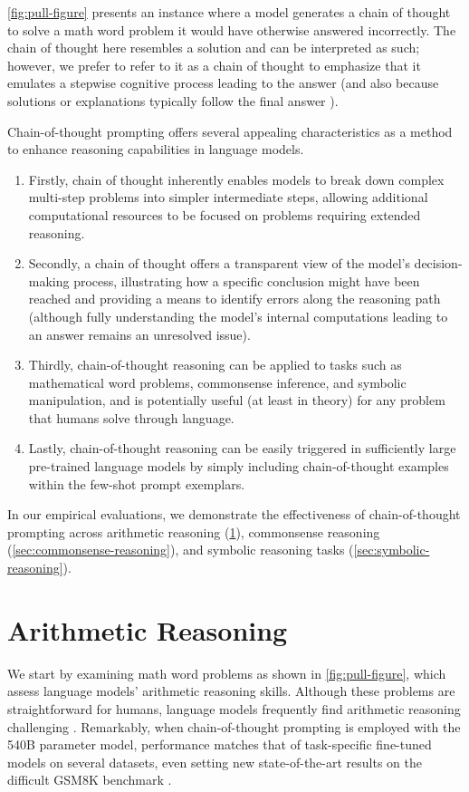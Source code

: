 \cref{fig:pull-figure} presents an instance where a model generates a chain of thought to solve a math word problem it would have otherwise answered incorrectly. The chain of thought here resembles a solution and can be interpreted as such; however, we prefer to refer to it as a chain of thought to emphasize that it emulates a stepwise cognitive process leading to the answer (and also because solutions or explanations typically follow the final answer \citep[][\textit{inter alia}]{narang2020wt5,wiegreffe2021reframing,lampinen2022can}).

Chain-of-thought prompting offers several appealing characteristics as a method to enhance reasoning capabilities in language models.

\begin{enumerate}[topsep=1pt,itemsep=0ex]
    \item Firstly, chain of thought inherently enables models to break down complex multi-step problems into simpler intermediate steps, allowing additional computational resources to be focused on problems requiring extended reasoning.
    \item Secondly, a chain of thought offers a transparent view of the model’s decision-making process, illustrating how a specific conclusion might have been reached and providing a means to identify errors along the reasoning path (although fully understanding the model’s internal computations leading to an answer remains an unresolved issue).
    \item Thirdly, chain-of-thought reasoning can be applied to tasks such as mathematical word problems, commonsense inference, and symbolic manipulation, and is potentially useful (at least in theory) for any problem that humans solve through language.
    \item Lastly, chain-of-thought reasoning can be easily triggered in sufficiently large pre-trained language models by simply including chain-of-thought examples within the few-shot prompt exemplars.
\end{enumerate}

In our empirical evaluations, we demonstrate the effectiveness of chain-of-thought prompting across arithmetic reasoning (\cref{sec:arithmetic-reasoning}), commonsense reasoning (\cref{sec:commonsense-reasoning}), and symbolic reasoning tasks (\cref{sec:symbolic-reasoning}).

\section{Arithmetic Reasoning}\label{sec:arithmetic-reasoning}
We start by examining math word problems as shown in \cref{fig:pull-figure}, which assess language models’ arithmetic reasoning skills. Although these problems are straightforward for humans, language models frequently find arithmetic reasoning challenging \citep[][\textit{inter alia}]{hendrycks2021measuring,patel-etal-2021-nlp}. Remarkably, when chain-of-thought prompting is employed with the 540B parameter model, performance matches that of task-specific fine-tuned models on several datasets, even setting new state-of-the-art results on the difficult GSM8K benchmark \citep{cobbe2021training}.

